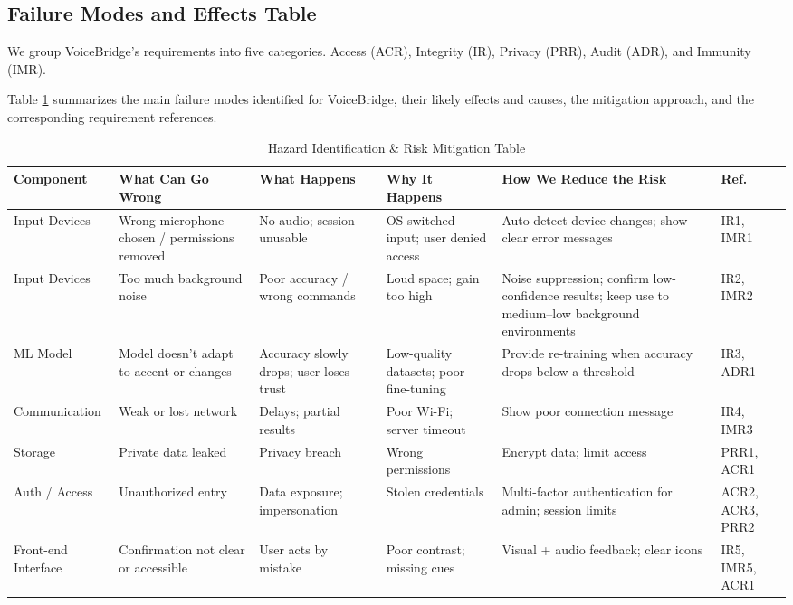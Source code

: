 \documentclass{article}
\begin{document}
\subsection{Failure Modes and Effects Table}
We group VoiceBridge’s requirements into five categories. Access (ACR), Integrity (IR), Privacy (PRR), Audit (ADR), and Immunity (IMR).

Table \ref{tab:fmea-risk-mitigation} summarizes the main failure modes identified for VoiceBridge, their likely effects and causes, the mitigation approach, and the corresponding requirement references.


\begin{table}[h!]
\centering
\renewcommand{\arraystretch}{1.8} %
\setlength{\tabcolsep}{3pt}
\scriptsize \LARGE
{ %
\scriptsize
\begin{tabular}{|
  >{\raggedright\arraybackslash}p{2.0cm}|
  >{\raggedright\arraybackslash}p{2.0cm}|
  >{\raggedright\arraybackslash}p{2.0cm}|
  >{\raggedright\arraybackslash}p{1.8cm}|
  >{\raggedright\arraybackslash}p{2.5cm}|
  >{\raggedright\arraybackslash}p{1.8cm}|}
\hline
\textbf{Component} & \textbf{What Can Go Wrong} & \textbf{What Happens} & \textbf{Why It Happens} & \textbf{How We Reduce the Risk} & \textbf{Ref.} \\
\hline
Input Devices & Wrong microphone chosen / permissions removed & No audio; session unusable & OS switched input; user denied access & Auto-detect device changes; show clear error messages & IR1, IMR1 \\
\hline
Input Devices & Too much background noise & Poor accuracy / wrong commands & Loud space; gain too high & Noise suppression; confirm low-confidence results; keep use to medium–low background environments & IR2, IMR2 \\
\hline
ML Model & Model doesn’t adapt to accent or changes & Accuracy slowly drops; user loses trust & Low-quality datasets; poor fine-tuning & Provide re-training when accuracy drops below a threshold & IR3, ADR1 \\
\hline
Communication & Weak or lost network & Delays; partial results & Poor Wi-Fi; server timeout & Show poor connection message & IR4, IMR3 \\
\hline
Storage & Private data leaked & Privacy breach & Wrong permissions & Encrypt data; limit access & PRR1, ACR1 \\
\hline
Auth / Access & Unauthorized entry & Data exposure; impersonation & Stolen credentials & Multi-factor authentication for admin; session limits & ACR2, ACR3, PRR2 \\
\hline
Front-end Interface & Confirmation not clear or accessible & User acts by mistake & Poor contrast; missing cues & Visual + audio feedback; clear icons & IR5, IMR5, ACR1 \\
\hline
\end{tabular}
}
\caption{
Hazard Identification \& Risk Mitigation Table}
\label{tab:fmea-risk-mitigation}


\end{table}
\end{document}
